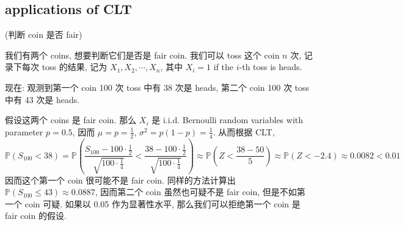 \subsection{applications of CLT}
\begin{example}{(判断 coin 是否 fair)}

我们有两个 coins, 想要判断它们是否是 fair coin. 
我们可以 toss 这个 coin $n$ 次, 记录下每次 toss 的结果, 
记为 $X_1, X_2, \cdots, X_n$,
 其中 $X_i = 1$ if the $i$-th toss is heads.

现在: 观测到第一个 coin 100 次 toss 中有 38 次是 heads,
第二个 coin 100 次 toss 中有 43 次是 heads.

\begin{solution}
假设这两个 coins 是 fair coin.
那么 $X_i$ 是 i.i.d. Bernoulli random variables
 with parameter $p=0.5$, 因而
$\mu = p = \frac{1}{2}$, 
$\sigma^2 =  p(1-p) = \frac{1}{4}$. 
从而根据 CLT, 
$$ 
\mathbb{P}(S_100 < 38) 
=   
\mathbb{P}\left(\frac{S_{100} - 100 \cdot \frac{1}{2}}{\sqrt{100 \cdot \frac{1}{4}}} < \frac{38 - 100 \cdot \frac{1}{2}}{\sqrt{100 \cdot \frac{1}{4}}}\right)
\approx
\mathbb{P}\left(Z < \frac{38 - 50}{5}\right) \approx 
 \mathbb{P}(Z < -2.4) \approx 0.0082 < 0.01
$$
因而这个第一个 coin 很可能不是 fair coin.
同样的方法计算出 $\mathbb{P}\left(S_{100} \leq 43\right) \approx 0.0887$, 
因而第二个 coin 虽然也可疑不是 fair coin,
但是不如第一个 coin 可疑. 如果以 0.05 作为显著性水平, 
那么我们可以拒绝第一个 coin 是 fair coin 的假设.\\
\end{solution}
\end{example}



